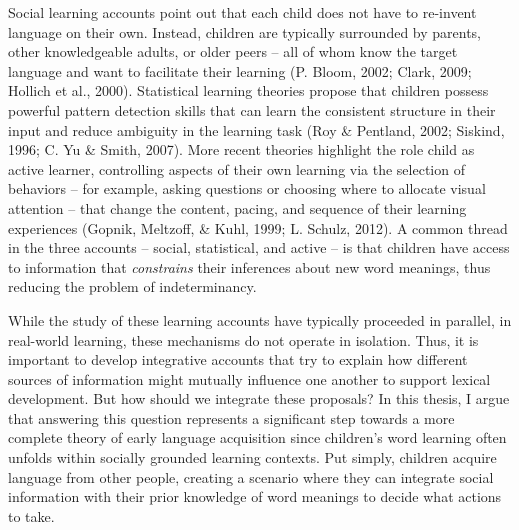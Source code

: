 \documentclass[oneside]{report}
\begin{document}
Social learning accounts point out that each child does not have to
re-invent language on their own. Instead, children are typically
surrounded by parents, other knowledgeable adults, or older peers -- all
of whom know the target language and want to facilitate their learning
(P. Bloom, 2002; Clark, 2009; Hollich et al., 2000). Statistical
learning theories propose that children possess powerful pattern
detection skills that can learn the consistent structure in their input
and reduce ambiguity in the learning task (Roy \& Pentland, 2002;
Siskind, 1996; C. Yu \& Smith, 2007). More recent theories highlight the
role child as active learner, controlling aspects of their own learning
via the selection of behaviors -- for example, asking questions or
choosing where to allocate visual attention -- that change the content,
pacing, and sequence of their learning experiences (Gopnik, Meltzoff, \&
Kuhl, 1999; L. Schulz, 2012). A common thread in the three accounts --
social, statistical, and active -- is that children have access to
information that \emph{constrains} their inferences about new word
meanings, thus reducing the problem of indeterminancy.

While the study of these learning accounts have typically proceeded in
parallel, in real-world learning, these mechanisms do not operate in
isolation. Thus, it is important to develop integrative accounts that
try to explain how different sources of information might mutually
influence one another to support lexical development. But how should we
integrate these proposals? In this thesis, I argue that answering this
question represents a significant step towards a more complete theory of
early language acquisition since children's word learning often unfolds
within socially grounded learning contexts. Put simply, children acquire
language from other people, creating a scenario where they can integrate
social information with their prior knowledge of word meanings to decide
what actions to take.
\end{document}
